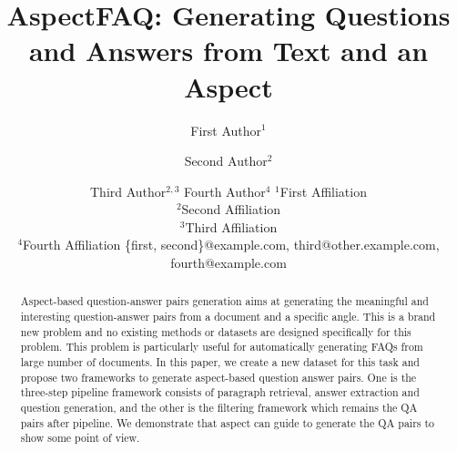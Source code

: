 \documentclass{article}
\title{AspectFAQ: Generating Questions and Answers from Text and an Aspect}
\author{
First Author$^1$
\and
Second Author$^2$\and
Third Author$^{2,3}$\And
Fourth Author$^4$
\affiliations
$^1$First Affiliation\\
$^2$Second Affiliation\\
$^3$Third Affiliation\\
$^4$Fourth Affiliation
\emails
\{first, second\}@example.com,
third@other.example.com,
fourth@example.com
}
\begin{document}
\maketitle

\begin{abstract}
Aspect-based question-answer pairs generation aims at generating the 
meaningful and interesting question-answer pairs from a document and 
a specific angle. This is a brand new problem and no existing
methods or datasets are designed specifically for this problem. 
This problem is particularly useful for automatically generating
FAQs from large number of documents. 
In this paper, we create a new dataset for this task and propose
 two frameworks to generate aspect-based question answer pairs.
One is the three-step pipeline framework consists of paragraph retrieval, answer extraction and question generation,
and the other is the filtering framework which remains the QA pairs after pipeline.
 We demonstrate that aspect can guide to generate the QA pairs to show some point of view. 


\end{abstract}















\end{document}
